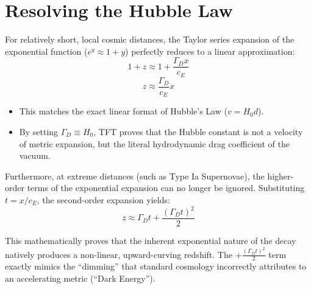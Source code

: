 \section{Resolving the Hubble Law}
For relatively short, local cosmic distances, the Taylor series expansion of the exponential function ($e^y \approx 1+y$) perfectly reduces to a linear approximation:
\begin{equation}
    1+z \approx 1 + \frac{\Gamma_D x}{c_E}
\end{equation}
\begin{equation}
    z \approx \frac{\Gamma_D}{c_E} x
\end{equation}

\begin{itemize}
    \item This matches the exact linear format of Hubble's Law ($v = H_0 d$).
    \item By setting $\Gamma_D \equiv H_0$, TFT proves that the Hubble constant is not a velocity of metric expansion, but the literal hydrodynamic drag coefficient of the vacuum.
\end{itemize}

Furthermore, at extreme distances (such as Type Ia Supernovae), the higher-order terms of the exponential expansion can no longer be ignored. Substituting $t = x/c_E$, the second-order expansion yields:
\begin{equation}
    z \approx \Gamma_D t + \frac{(\Gamma_D t)^2}{2}
\end{equation}

This mathematically proves that the inherent exponential nature of the decay natively produces a non-linear, upward-curving redshift. The $+\frac{(\Gamma_D t)^2}{2}$ term exactly mimics the ``dimming'' that standard cosmology incorrectly attributes to an accelerating metric (``Dark Energy'').